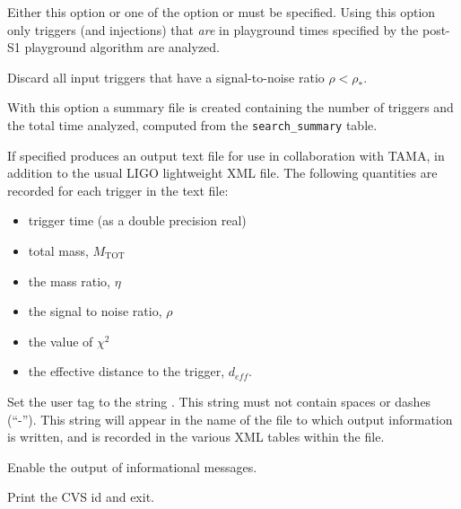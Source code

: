 \begin{entry}
\begin{entry}
\item[ \option{--playground-only}]
Either this option or one of the option  or  must be specified.
Using this option only triggers (and injections) that \emph{are} in playground times specified by the post-S1 playground algorithm are analyzed.

\item[\option{--snr-threshold} \parm{$\rho_\ast$}] 
Discard all input triggers that have a signal-to-noise ratio $\rho < \rho_\ast$.

\item[\option{--summary-file} \parm{file}]
With this option a summary file  is created containing the number of triggers and the total time analyzed, computed from the  \verb$search_summary$ table.

\item[\option{--tama-output} \parm{file}] 
If specified produces
an output text file  for use in collaboration with TAMA, in
addition to the usual LIGO lightweight XML file.  The following quantities are
recorded for each trigger in the text file:

\begin{itemize}
\item trigger time (as a double precision real)
\item total mass, $M_{\mathrm{TOT}}$
\item the mass ratio, $\eta$
\item the signal to noise ratio, $\rho$
\item the value of $\chi^2$
\item the effective distance to the trigger, $d_{eff}$.
\end{itemize}

\item[\option{--user-tag} \parm{comment}]
Set the user tag to the string .  This string must not
contain spaces or dashes (``-'').  This string will appear in the name of
the file to which output information is written, and is recorded in the
various XML tables within the file.

\item[\option{--verbose}]
Enable the output of informational messages.

\item[\option{--version}]
Print the CVS id and exit.


\end{entry}


\end{entry}

